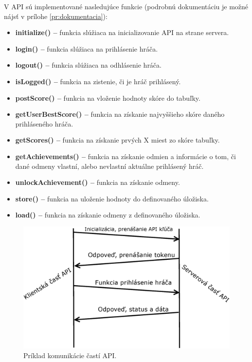 V API sú implementované nasledujúce funkcie (podrobnú dokumentáciu je možné nájsť v prílohe \ref{pr:dokumentacia}):
\begin{itemize}
\item \textbf{initialize() –} funkcia slúžiaca na inicializovanie API na strane servera.
\item \textbf{login() –} funkcia slúžiaca na prihlásenie hráča.
\item \textbf{logout() –} funkcia slúžiaca na odhlásenie hráča.
\item \textbf{isLogged() –} funkcia na zistenie, či je hráč prihlásený.
\item \textbf{postScore() –} funkcia na vloženie hodnoty skóre do tabuľky.
\item \textbf{getUserBestScore() –} funkcia na získanie najvyššieho skóre daného prihláseného hráča.
\item \textbf{getScores() –} funkcia na získanie prvých X miest zo skóre tabuľky.
\item \textbf{getAchievements() –} funkcia na získanie odmien a informácie o tom, či dané odmeny vlastní, alebo nevlastní aktuálne prihlásený hráč.
\item \textbf{unlockAchievement() –} funkcia na získanie odmeny.
\item \textbf{store() –} funkcia na uloženie hodnoty do definovaného úložiska.
\item \textbf{load() –} funkcia na získanie odmeny z definovaného úložiska.
\end{itemize}
\begin{figure}[h]
  \centering
  \includegraphics[scale=0.45]{fig/implementacia-komunikacia.eps}
  \caption{Príklad komunikácie častí API.}
  \label{fig:implementaciakomunikacia}
\end{figure}

